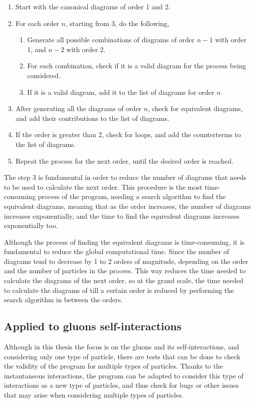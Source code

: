 \documentclass[11pt,a4paper,twoside,pdf]{article}
\numberwithin{equation}{section}
\begin{document}
\begin{enumerate}
    \item Start with the canonical diagrams of order 1 and 2.
    \item For each order $n$, starting from 3, do the following,
    \begin{enumerate}
        \item Generate all possible combinations of diagrams of order $n-1$ with
        order 1, and $n-2$ with order 2.
        \item For each combination, check if it is a valid diagram for the process
        being considered.
        \item If it is a valid diagram, add it to the list of diagrams for order $n$.
    \end{enumerate}
    \item After generating all the diagrams of order $n$, check for equivalent diagrams,
    and add their contributions to the list of diagrams.
    \item If the order is greater than 2, check for loops, and add the counterterms 
    to the list of diagrams.
    \item Repeat the process for the next order, until the desired order is reached.
\end{enumerate}

The step 3 is fundamental in order to reduce the number of diagrams that needs to 
be used to calculate the next order. This procedure is the most time-consuming process 
of the program, needing a search algorithm to find the equivalent diagrams, meaning 
that as the order increases, the number of diagrams increases exponentially, and the 
time to find the equivalent diagrams increases exponentially too. 

Although the process of finding the equivalent diagrams is time-consuming, it is
fundamental to reduce the global computational time. Since the number of diagrams 
tend to decrease by 1 to 2 orders of magnitude, depending on the order and the number of
particles in the process. This way reduces the time needed to calculate the
diagrams of the next order, so at the grand scale, the time needed to calculate
the diagrams of till a certain order is reduced by performing the search algorithm in
between the orders.


\subsection{Applied to gluons self-interactions} \label{sec:applied_gluons}
Although in this thesis the focus is on the gluons and its self-interactions, 
and considering only one type of particle, there are tests that can be done to 
check the validity of the program for multiple types of particles. Thanks to
the instantaneous interactions, the program can be adapted to consider this 
type of interactions as a new type of particles, and thus check for bugs or other 
issues that may arise when considering multiple types of particles.
\end{document}
